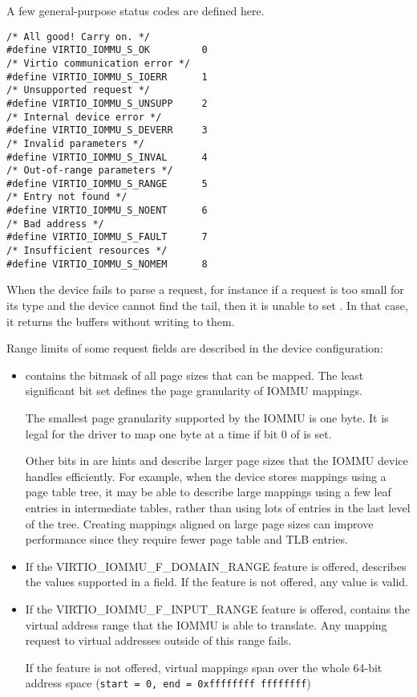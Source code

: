 A few general-purpose status codes are defined here.

\begin{lstlisting}
/* All good! Carry on. */
#define VIRTIO_IOMMU_S_OK         0
/* Virtio communication error */
#define VIRTIO_IOMMU_S_IOERR      1
/* Unsupported request */
#define VIRTIO_IOMMU_S_UNSUPP     2
/* Internal device error */
#define VIRTIO_IOMMU_S_DEVERR     3
/* Invalid parameters */
#define VIRTIO_IOMMU_S_INVAL      4
/* Out-of-range parameters */
#define VIRTIO_IOMMU_S_RANGE      5
/* Entry not found */
#define VIRTIO_IOMMU_S_NOENT      6
/* Bad address */
#define VIRTIO_IOMMU_S_FAULT      7
/* Insufficient resources */
#define VIRTIO_IOMMU_S_NOMEM      8
\end{lstlisting}

When the device fails to parse a request, for instance if a request is too
small for its type and the device cannot find the tail, then it is unable
to set . In that case, it returns the buffers without
writing to them.

Range limits of some request fields are described in the device
configuration:

\begin{itemize}
\item {} contains the bitmask of all page sizes that
  can be mapped. The least significant bit set defines the page
  granularity of IOMMU mappings.

  The smallest page granularity supported by the IOMMU is one byte. It is
  legal for the driver to map one byte at a time if bit 0 of
   is set.

  Other bits in  are hints and describe larger page
  sizes that the IOMMU device handles efficiently. For example, when the
  device stores mappings using a page table tree, it may be able to
  describe large mappings using a few leaf entries in intermediate tables,
  rather than using lots of entries in the last level of the tree.
  Creating mappings aligned on large page sizes can improve performance
  since they require fewer page table and TLB entries.

\item If the VIRTIO_IOMMU_F_DOMAIN_RANGE feature is offered,
   describes the values supported in a 
  field. If the feature is not offered, any  value is valid.

\item If the VIRTIO_IOMMU_F_INPUT_RANGE feature is offered,
   contains the virtual address range that the IOMMU is
  able to translate. Any mapping request to virtual addresses outside of
  this range fails.

  If the feature is not offered, virtual mappings span over the whole
  64-bit address space (\texttt{start = 0, end = 0xffffffff ffffffff})
\end{itemize}

